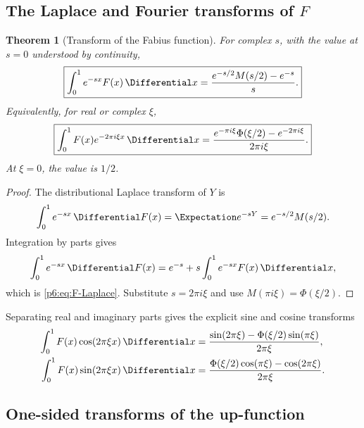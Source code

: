 \documentclass[11pt]{article}
\newtheorem{theorem}{Theorem}[section]
\theoremstyle{definition}
\theoremstyle{remark}
\begin{document}
\subsection[The Laplace and Fourier transforms of F]{The Laplace and Fourier transforms of \(F\)}

\begin{theorem}[Transform of the Fabius function]\label{p6:thm:F-transform}
For complex \(s\), with the value at \(s=0\) understood by continuity,
\begin{equation}
 \boxed{
 \int_0^1 e^{-sx}F(x)\,\Differential x
 =\frac{e^{-s/2}M(s/2)-e^{-s}}{s}.
 }                                                           \label{p6:eq:F-Laplace}
\end{equation}
Equivalently, for real or complex \(\xi\),
\begin{equation}
 \boxed{
 \int_0^1F(x)e^{-2\pi i\xi x}\,\Differential x
 =\frac{e^{-\pi i\xi}\Phi(\xi/2)-e^{-2\pi i\xi}}{2\pi i\xi}.
 }                                                           \label{p6:eq:F-Fourier}
\end{equation}
At \(\xi=0\), the value is \(1/2\).
\end{theorem}

\begin{proof}
The distributional Laplace transform of \(Y\) is
\begin{equation}
 \int_0^1 e^{-sx}\,\Differential F(x)=\Expectation e^{-sY}=e^{-s/2}M(s/2).       \label{p6:eq:dF-Laplace}
\end{equation}
Integration by parts gives
\[
 \int_0^1e^{-sx}\,\Differential F(x)
 =e^{-s}+s\int_0^1e^{-sx}F(x)\,\Differential x,
\]
which is \eqref{p6:eq:F-Laplace}.  Substitute \(s=2\pi i\xi\) and use
\(M(\pi i\xi)=\Phi(\xi/2)\).
\end{proof}

Separating real and imaginary parts gives the explicit sine and cosine transforms
\begin{align}
 \int_0^1F(x)\cos(2\pi\xi x)\,\Differential x
 &=\frac{\sin(2\pi\xi)-\Phi(\xi/2)\sin(\pi\xi)}{2\pi\xi},    \label{p6:eq:F-cosine-transform}\\
 \int_0^1F(x)\sin(2\pi\xi x)\,\Differential x
 &=\frac{\Phi(\xi/2)\cos(\pi\xi)-\cos(2\pi\xi)}{2\pi\xi}. \label{p6:eq:F-sine-transform}
\end{align}

\subsection{One-sided transforms of the up-function}
\end{document}

